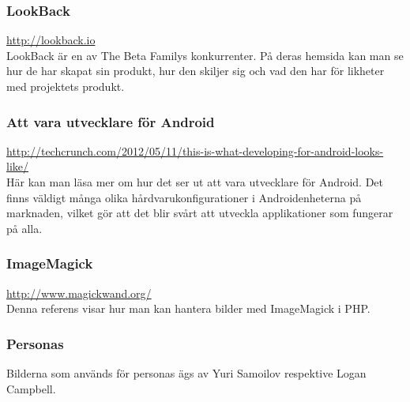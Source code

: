 \subsubsection{LookBack}
\url{http://lookback.io} \\
LookBack är en av The Beta Familys konkurrenter. På deras hemsida kan man se hur de har skapat sin produkt, hur den skiljer sig och vad den har för likheter med projektets produkt.

\subsubsection{Att vara utvecklare för Android}
\url{http://techcrunch.com/2012/05/11/this-is-what-developing-for-android-looks-like/} \\
Här kan man läsa mer om hur det ser ut att vara utvecklare för Android. Det finns väldigt många olika hårdvarukonfigurationer i Androidenheterna på marknaden, vilket gör att det blir svårt att utveckla applikationer som fungerar på alla.

\subsubsection{ImageMagick}
\url{http://www.magickwand.org/} \\
Denna referens visar hur man kan hantera bilder med ImageMagick i PHP.

\subsubsection{Personas}
Bilderna som används för personas ägs av Yuri Samoilov respektive Logan Campbell.
